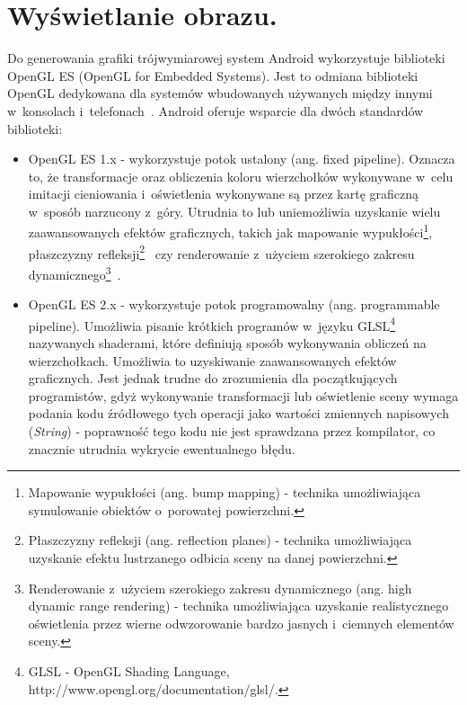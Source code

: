 \documentclass[a4paper,twocolumn,11pt]{article}
\begin{document}
 




\section{Wyświetlanie obrazu.} \label{sec:image_rendering}

Do generowania grafiki trójwymiarowej system Android wykorzystuje biblioteki OpenGL ES (OpenGL for Embedded Systems).
Jest to odmiana biblioteki OpenGL dedykowana dla systemów wbudowanych używanych między innymi w~konsolach i~telefonach~\cite{ogl:es}.
Android oferuje wsparcie dla dwóch standardów biblioteki:

\begin{itemize}
 \item OpenGL ES 1.x - wykorzystuje potok ustalony (ang. fixed pipeline).
  Oznacza to, że transformacje oraz obliczenia koloru wierzchołków wykonywane w~celu imitacji cieniowania i~oświetlenia wykonywane są przez kartę graficzną w~sposób narzucony z~góry.
  Utrudnia to lub uniemożliwia uzyskanie wielu zaawansowanych efektów graficznych, takich jak mapowanie wypukłości\footnote{Mapowanie wypukłości (ang. bump mapping) - technika umożliwiająca symulowanie obiektów o~porowatej powierzchni.}, płaszczyzny refleksji\footnote{Płaszczyzny refleksji (ang. reflection planes) - technika umożliwiająca uzyskanie efektu lustrzanego odbicia sceny na danej powierzchni.}~\cite{tec:3d} czy renderowanie z~użyciem szerokiego zakresu dynamicznego\footnote{Renderowanie z~użyciem szerokiego zakresu dynamicznego (ang. high dynamic range rendering) - technika umożliwiająca uzyskanie realistycznego oświetlenia przez wierne odwzorowanie bardzo jasnych i~ciemnych elementów sceny.}~\cite{nvi:hdr}. 
 \item OpenGL ES 2.x - wykorzystuje potok programowalny (ang. programmable pipeline).
  Umożliwia pisanie krótkich programów w~języku GLSL\footnote{GLSL - OpenGL Shading Language, http://www.opengl.org/documentation/glsl/.} nazywanych shaderami, które definiują sposób wykonywania obliczeń na wierzchołkach.
  Umożliwia to uzyskiwanie zaawansowanych efektów graficznych. Jest jednak trudne do zrozumienia dla początkujących programistów, gdyż wykonywanie transformacji lub oświetlenie sceny wymaga podania kodu źródłowego tych operacji jako wartości zmiennych napisowych (\emph{String}) - poprawność tego kodu nie jest sprawdzana przez kompilator, co znacznie utrudnia wykrycie ewentualnego błędu.
\end{itemize}
\end{document}
